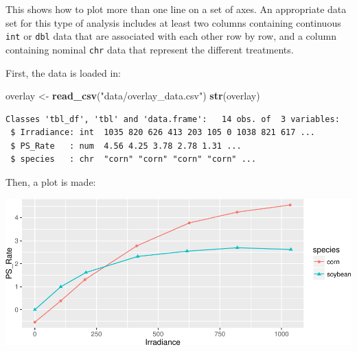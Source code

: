 \documentclass[twoside, 12pt]{article}
\newenvironment{Shaded}{\begin{snugshade}}{\end{snugshade}}
\newcommand{\KeywordTok}[1]{\textcolor[rgb]{0.13,0.29,0.53}{\textbf{{#1}}}}
\newcommand{\DataTypeTok}[1]{\textcolor[rgb]{0.13,0.29,0.53}{{#1}}}
\newcommand{\StringTok}[1]{\textcolor[rgb]{0.31,0.60,0.02}{{#1}}}
\newcommand{\NormalTok}[1]{{#1}}
\begin{document}
This shows how to plot more than one line on a set of axes. An
appropriate data set for this type of analysis includes at least two
columns containing continuous \texttt{int} or \texttt{dbl} data that are
associated with each other row by row, and a column containing nominal
\texttt{chr} data that represent the different treatments.

First, the data is loaded in:

\begin{Shaded}
\begin{Highlighting}[]
\NormalTok{overlay <-}\StringTok{ }\KeywordTok{read_csv}\NormalTok{(}\StringTok{"data/overlay_data.csv"}\NormalTok{)}
\KeywordTok{str}\NormalTok{(overlay)}
\end{Highlighting}
\end{Shaded}

\begin{Verbatim}[frame=single]
Classes 'tbl_df', 'tbl' and 'data.frame':   14 obs. of  3 variables:
 $ Irradiance: int  1035 820 626 413 203 105 0 1038 821 617 ...
 $ PS_Rate   : num  4.56 4.25 3.78 2.78 1.31 ...
 $ species   : chr  "corn" "corn" "corn" "corn" ...
\end{Verbatim}

Then, a plot is made:

\begin{Shaded}
\end{Shaded}

\includegraphics{skeleton_files/figure-latex/unnamed-chunk-48-1.pdf}
\end{document}
